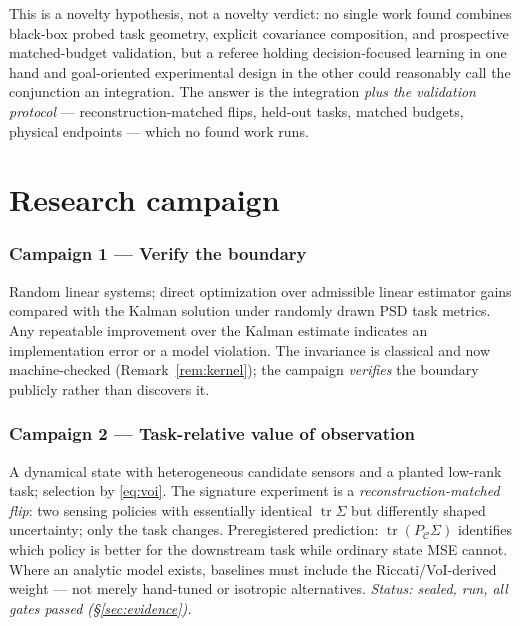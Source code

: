 \documentclass[letterpaper,onecolumn]{IEEEtran}
\theoremstyle{definition}
\theoremstyle{remark}
\newcommand{\PC}{P_{\mathcal{C}}}
\newcommand{\tr}{\operatorname{tr}}
\newcommand{\Sig}{\Sigma}
\begin{document}
This is a novelty hypothesis, not a novelty verdict: no single work found
combines black-box probed task geometry, explicit covariance
composition, and prospective matched-budget validation, but a referee
holding decision-focused learning in one hand and goal-oriented experimental
design in the other could reasonably call the conjunction an integration.
The answer is the integration \emph{plus the validation protocol} ---
reconstruction-matched flips, held-out tasks, matched budgets, physical
endpoints --- which no found work runs.

\section{Research campaign}
\label{sec:campaigns}

\subsubsection*{Campaign 1 --- Verify the boundary}
Random linear systems; direct optimization over admissible linear estimator
gains compared with the Kalman solution under randomly drawn PSD task
metrics. Any repeatable improvement over the Kalman estimate indicates an
implementation error or a model violation. The invariance is classical and
now machine-checked (Remark~\ref{rem:kernel}); the campaign \emph{verifies}
the boundary publicly rather than discovers it.

\subsubsection*{Campaign 2 --- Task-relative value of observation}
A dynamical state with heterogeneous candidate sensors and a planted low-rank
task; selection by \eqref{eq:voi}. The signature experiment is a
\emph{reconstruction-matched flip}: two sensing policies with essentially
identical $\tr\Sig$ but differently shaped uncertainty; only the task
changes. Preregistered prediction: $\tr(\PC\Sig)$ identifies which policy is
better for the downstream task while ordinary state MSE cannot. Where an
analytic model exists, baselines must include the Riccati/VoI-derived weight
--- not merely hand-tuned or isotropic alternatives.
\emph{Status: sealed, run, all gates passed (\S\ref{sec:evidence}).}
\end{document}
